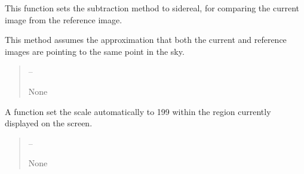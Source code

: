 \documentclass[letterpaper,11pt,english]{sphinxmanual}
\begin{document}
\begin{savenotes}
\begin{fulllineitems}
\begin{savenotes}\begin{fulllineitems}
\label{\detokenize{code/opihiexarata.gui.selector:opihiexarata.gui.selector.TargetSelectorWindow.__connect_push_button_mode_sidereal}}
\pysigstartsignatures
{}
\pysigstopsignatures
\sphinxAtStartPar
This function sets the subtraction method to sidereal, for comparing
the current image from the reference image.

\sphinxAtStartPar
This method assumes the approximation that both the current and
reference images are pointing to the same point in the sky.
\begin{quote}\begin{description}
\sphinxAtStartPar
{} – 

\sphinxAtStartPar
None

\end{description}\end{quote}

\end{fulllineitems}\end{savenotes}


\begin{savenotes}\begin{fulllineitems}
\label{\detokenize{code/opihiexarata.gui.selector:opihiexarata.gui.selector.TargetSelectorWindow.__connect_push_button_scale_1_99}}
\pysigstartsignatures
{}
\pysigstopsignatures
\sphinxAtStartPar
A function set the scale automatically to 1\sphinxhyphen{}99 within the
region currently displayed on the screen.
\begin{quote}\begin{description}
\sphinxAtStartPar
{} – 

\sphinxAtStartPar
None

\end{description}\end{quote}


\end{fulllineitems}
\end{savenotes}
\end{fulllineitems}
\end{savenotes}
\end{document}
